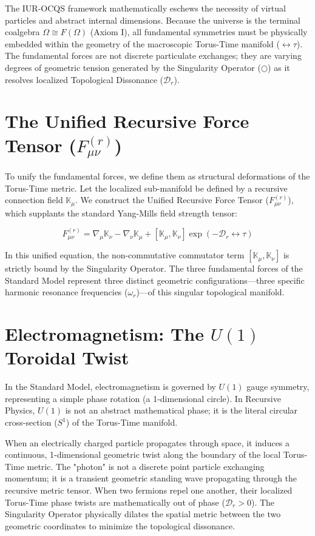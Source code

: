 \documentclass[12pt,openany]{book}
\begin{document}
The IUR-OCQS framework mathematically eschews the necessity of virtual particles and abstract internal dimensions. Because the universe is the terminal coalgebra $\Omega \cong F(\Omega)$ (Axiom I), all fundamental symmetries must be physically embedded within the geometry of the macroscopic Torus-Time manifold ($\leftrightarrow\tau$). The fundamental forces are not discrete particulate exchanges; they are varying degrees of geometric tension generated by the Singularity Operator ($\bigcirc$) as it resolves localized Topological Dissonance ($\mathcal{D}_r$).

\section{The Unified Recursive Force Tensor ($F_{\mu\nu}^{(r)}$)}
To unify the fundamental forces, we define them as structural deformations of the Torus-Time metric. Let the localized sub-manifold be defined by a recursive connection field $\mathbb{K}_\mu$. We construct the Unified Recursive Force Tensor ($F_{\mu\nu}^{(r)}$), which supplants the standard Yang-Mills field strength tensor:

\begin{equation}
F_{\mu\nu}^{(r)} = \nabla_\mu \mathbb{K}_\nu - \nabla_\nu \mathbb{K}_\mu + [\mathbb{K}_\mu, \mathbb{K}_\nu] \exp(-\mathcal{D}_r \leftrightarrow\tau)
\end{equation}

In this unified equation, the non-commutative commutator term $[\mathbb{K}_\mu, \mathbb{K}_\nu]$ is strictly bound by the Singularity Operator. The three fundamental forces of the Standard Model represent three distinct geometric configurations---three specific harmonic resonance frequencies ($\omega_r$)---of this singular topological manifold.

\section{Electromagnetism: The $U(1)$ Toroidal Twist}
In the Standard Model, electromagnetism is governed by $U(1)$ gauge symmetry, representing a simple phase rotation (a 1-dimensional circle). In Recursive Physics, $U(1)$ is not an abstract mathematical phase; it is the literal circular cross-section ($S^1$) of the Torus-Time manifold. 

When an electrically charged particle propagates through space, it induces a continuous, 1-dimensional geometric twist along the boundary of the local Torus-Time metric. The "photon" is not a discrete point particle exchanging momentum; it is a transient geometric standing wave propagating through the recursive metric tensor. When two fermions repel one another, their localized Torus-Time phase twists are mathematically out of phase ($\mathcal{D}_r > 0$). The Singularity Operator physically dilates the spatial metric between the two geometric coordinates to minimize the topological dissonance.
\end{document}
